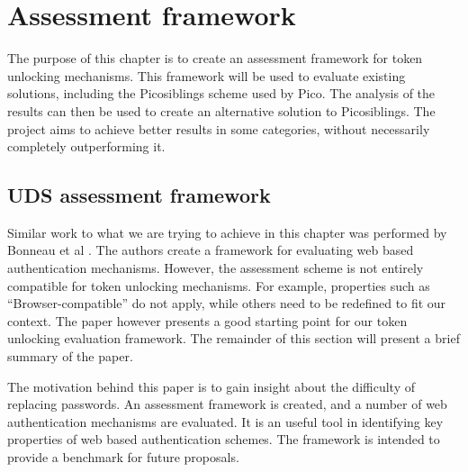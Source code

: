 
\chapter{Assessment framework}

\label{Chapter5}


The purpose of this chapter is to create an assessment framework for token unlocking mechanisms. This framework will be used to evaluate existing solutions, including the Picosiblings scheme used by Pico. The analysis of the results can then be used to create an alternative solution to Picosiblings. The project aims to achieve better results in some categories, without necessarily completely outperforming it.



\section{UDS assessment framework}

Similar work to what we are trying to achieve in this chapter was performed by Bonneau et al \cite{bonneau2012quest}. The authors create a framework for evaluating web based authentication mechanisms. However, the assessment scheme is not entirely compatible for token unlocking mechanisms. For example, properties such as ``Browser-compatible'' do not apply, while others need to be redefined to fit our context.  The paper however presents a good starting point for our token unlocking evaluation framework. The remainder of this section will present a brief summary of the paper.

The motivation behind this paper is to gain insight about the difficulty of replacing passwords. An assessment framework is created, and a number of web authentication mechanisms are evaluated. It is an useful tool in identifying key properties of web based authentication schemes. The framework is intended to provide a benchmark for future proposals.

